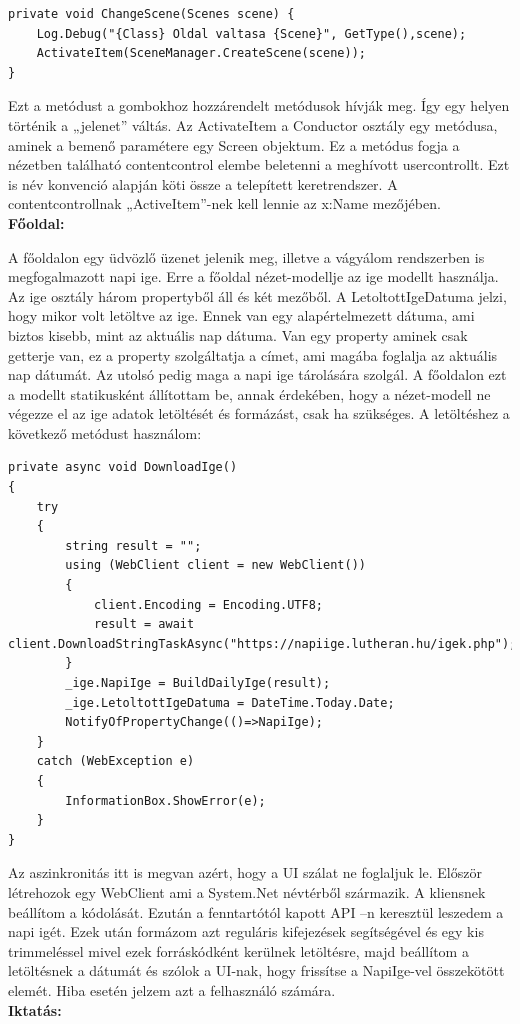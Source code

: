 \documentclass[
]{thesis-ekf}
\theoremstyle{definition}
\theoremstyle{remark}
\begin{document}
\begin{lstlisting}[showstringspaces=false,caption={Nézet váltás metódusa},captionpos=b]
private void ChangeScene(Scenes scene) {
	Log.Debug("{Class} Oldal valtasa {Scene}", GetType(),scene);
	ActivateItem(SceneManager.CreateScene(scene));
}
\end{lstlisting}
Ezt a metódust a gombokhoz hozzárendelt metódusok hívják meg. Így egy helyen történik a „jelenet” váltás. Az ActivateItem a Conductor osztály egy metódusa, aminek a bemenő paramétere egy Screen objektum. Ez a metódus fogja a nézetben található contentcontrol elembe beletenni a meghívott usercontrollt. Ezt is név konvenció alapján köti össze a telepített keretrendszer. A contentcontrollnak „ActiveItem”-nek kell lennie az x:Name mezőjében.\\
\textbf{Főoldal:}

A főoldalon egy üdvözlő üzenet jelenik meg, illetve a vágyálom rendszerben is megfogalmazott napi ige. Erre a főoldal nézet-modellje az ige modellt használja. Az ige osztály három propertyből áll és két mezőből. A LetoltottIgeDatuma jelzi, hogy mikor volt letöltve az ige. Ennek van egy alapértelmezett dátuma, ami biztos kisebb, mint az aktuális nap dátuma. Van egy property aminek csak getterje van, ez a property szolgáltatja a címet, ami magába foglalja az aktuális nap dátumát. Az utolsó pedig maga a napi ige tárolására szolgál. A főoldalon ezt a modellt statikusként állítottam be, annak érdekében, hogy a nézet-modell ne végezze el az ige adatok letöltését és formázást, csak ha szükséges. A letöltéshez a következő metódust használom:
\begin{lstlisting}[caption={Ige letöltése és formázása.},captionpos=b]
private async void DownloadIge()
{
	try
	{
		string result = "";
		using (WebClient client = new WebClient())
		{
			client.Encoding = Encoding.UTF8;
			result = await client.DownloadStringTaskAsync("https://napiige.lutheran.hu/igek.php");
		}
		_ige.NapiIge = BuildDailyIge(result);
		_ige.LetoltottIgeDatuma = DateTime.Today.Date;
		NotifyOfPropertyChange(()=>NapiIge);
	}
	catch (WebException e)
	{
		InformationBox.ShowError(e);
	}
}
\end{lstlisting}
Az aszinkronitás itt is megvan  azért, hogy a UI szálat ne foglaljuk le. Először létrehozok egy WebClient ami a System.Net névtérből származik. A kliensnek beállítom a kódolását. Ezután a fenntartótól kapott API –n keresztül leszedem a napi igét. Ezek után formázom azt reguláris kifejezések segítségével és egy kis trimmeléssel mivel ezek forráskódként kerülnek letöltésre, majd beállítom a letöltésnek a dátumát és szólok a UI-nak, hogy frissítse a NapiIge-vel összekötött elemét. Hiba esetén jelzem azt a felhasználó számára.\\
\textbf{Iktatás:}
\end{document}
